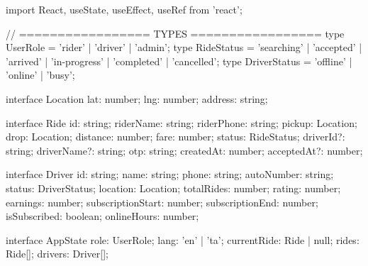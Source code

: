 import React, { useState, useEffect, useRef } from 'react';

// ================= TYPES =================
type UserRole = 'rider' | 'driver' | 'admin';
type RideStatus = 'searching' | 'accepted' | 'arrived' | 'in-progress' | 'completed' | 'cancelled';
type DriverStatus = 'offline' | 'online' | 'busy';

interface Location {
  lat: number;
  lng: number;
  address: string;
}

interface Ride {
  id: string;
  riderName: string;
  riderPhone: string;
  pickup: Location;
  drop: Location;
  distance: number;
  fare: number;
  status: RideStatus;
  driverId?: string;
  driverName?: string;
  otp: string;
  createdAt: number;
  acceptedAt?: number;
}

interface Driver {
  id: string;
  name: string;
  phone: string;
  autoNumber: string;
  status: DriverStatus;
  location: Location;
  totalRides: number;
  rating: number;
  earnings: number;
  subscriptionStart: number;
  subscriptionEnd: number;
  isSubscribed: boolean;
  onlineHours: number;
}

interface AppState {
  role: UserRole;
  lang: 'en' | 'ta';
  currentRide: Ride | null;
  rides: Ride[];
  drivers: Driver[];
}


